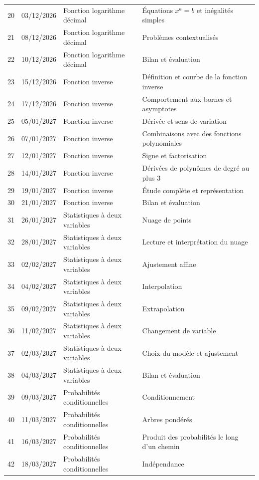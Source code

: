 \begin{longtable}{cclp{}}
20 & 03/12/2026 & Fonction logarithme décimal & Équations $x^a=b$ et inégalités simples\\
21 & 08/12/2026 & Fonction logarithme décimal & Problèmes contextualisés\\
22 & 10/12/2026 & Fonction logarithme décimal & Bilan et évaluation\\
23 & 15/12/2026 & Fonction inverse & Définition et courbe de la fonction inverse\\
24 & 17/12/2026 & Fonction inverse & Comportement aux bornes et asymptotes\\
25 & 05/01/2027 & Fonction inverse & Dérivée et sens de variation\\
26 & 07/01/2027 & Fonction inverse & Combinaisons avec des fonctions polynomiales\\
27 & 12/01/2027 & Fonction inverse & Signe et factorisation\\
28 & 14/01/2027 & Fonction inverse & Dérivées de polynômes de degré au plus 3\\
29 & 19/01/2027 & Fonction inverse & Étude complète et représentation\\
30 & 21/01/2027 & Fonction inverse & Bilan et évaluation\\
31 & 26/01/2027 & Statistiques à deux variables & Nuage de points\\
32 & 28/01/2027 & Statistiques à deux variables & Lecture et interprétation du nuage\\
33 & 02/02/2027 & Statistiques à deux variables & Ajustement affine\\
34 & 04/02/2027 & Statistiques à deux variables & Interpolation\\
35 & 09/02/2027 & Statistiques à deux variables & Extrapolation\\
36 & 11/02/2027 & Statistiques à deux variables & Changement de variable\\
37 & 02/03/2027 & Statistiques à deux variables & Choix du modèle et ajustement\\
38 & 04/03/2027 & Statistiques à deux variables & Bilan et évaluation\\
39 & 09/03/2027 & Probabilités conditionnelles & Conditionnement\\
40 & 11/03/2027 & Probabilités conditionnelles & Arbres pondérés\\
41 & 16/03/2027 & Probabilités conditionnelles & Produit des probabilités le long d'un chemin\\
42 & 18/03/2027 & Probabilités conditionnelles & Indépendance\\

\end{longtable}
